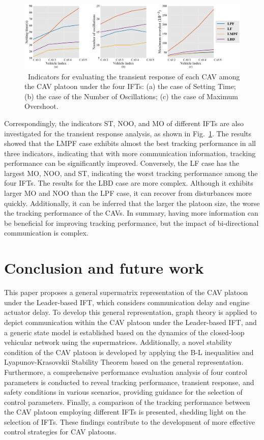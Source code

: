 \documentclass[a4paper]{cas-sc}
\begin{document}
\begin{figure}

  \centering
  \includegraphics[width=14cm]{figs/fig10.png}
  \caption{~Indicators for evaluating the transient response of each CAV among the CAV platoon under the four IFTs: (a) the case of Setting Time; (b) the case of the Number of Oscillations; (c) the case of Maximum Overshoot.}
  \label{fig10}
\end{figure}

Correspondingly, the indicators ST, NOO, and MO of different IFTs are also investigated for the transient response analysis, as shown in Fig.~\ref{fig10}. The results showed that the LMPF case exhibits almost the best tracking performance in all three indicators, indicating that with more communication information, tracking performance can be significantly improved. Conversely, the LF case has the largest MO, NOO, and ST, indicating the worst tracking performance among the four IFTs. The results for the LBD case are more complex. Although it exhibits larger MO and NOO than the LPF case, it can recover from disturbances more quickly. Additionally, it can be inferred that the larger the platoon size, the worse the tracking performance of the CAVs. In summary, having more information can be beneficial for improving tracking performance, but the impact of bi-directional communication is complex.






\section{Conclusion and future work}
\label{Section 6}

This paper proposes a general supermatrix representation of the CAV platoon under the Leader-based IFT, which considers communication delay and engine actuator delay. To develop this general representation, graph theory is applied to depict communication within the CAV platoon under the Leader-based IFT, and a generic state model is established based on the dynamics of the closed-loop vehicular network using the supermatrices. Additionally, a novel stability condition of the CAV platoon is developed by applying the B-L inequalities and Lyapunov-Krasovskii Stability Theorem based on the general representation. Furthermore, a comprehensive performance evaluation analysis of four control parameters is conducted to reveal tracking performance, transient response, and safety conditions in various scenarios, providing guidance for the selection of control parameters. Finally, a comparison of the tracking performance between the CAV platoon employing different IFTs is presented, shedding light on the selection of IFTs. These findings contribute to the development of more effective control strategies for CAV platoons.
\end{document}
